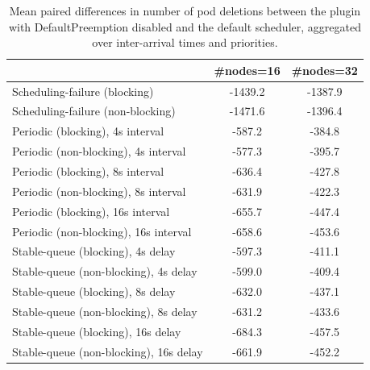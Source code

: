 \begin{table}[t]
\tiny
\setlength{\tabcolsep}{1.2pt}
\renewcommand{\arraystretch}{1.12}
\centering
\caption{Mean paired differences in number of pod deletions between the plugin with DefaultPreemption disabled and the default scheduler, aggregated over inter-arrival times and priorities.}
\label{tab:deletions-defpreempt0-std0-agg-arrival-prio}
\begin{tabular}{l c c}
\toprule
 & \#nodes=16 & \#nodes=32 \\
\midrule
Scheduling-failure (blocking) & -1439.2 & -1387.9 \\
Scheduling-failure (non-blocking) & -1471.6 & -1396.4 \\
Periodic (blocking), 4s interval & -587.2 & -384.8 \\
Periodic (non-blocking), 4s interval & -577.3 & -395.7 \\
Periodic (blocking), 8s interval & -636.4 & -427.8 \\
Periodic (non-blocking), 8s interval & -631.9 & -422.3 \\
Periodic (blocking), 16s interval & -655.7 & -447.4 \\
Periodic (non-blocking), 16s interval & -658.6 & -453.6 \\
Stable-queue (blocking), 4s delay & -597.3 & -411.1 \\
Stable-queue (non-blocking), 4s delay & -599.0 & -409.4 \\
Stable-queue (blocking), 8s delay & -632.0 & -437.1 \\
Stable-queue (non-blocking), 8s delay & -631.2 & -433.6 \\
Stable-queue (blocking), 16s delay & -684.3 & -457.5 \\
Stable-queue (non-blocking), 16s delay & -661.9 & -452.2 \\
\bottomrule
\end{tabular}
\end{table}

